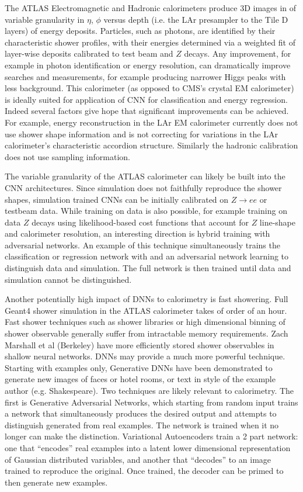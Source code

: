 
The ATLAS Electromagnetic and Hadronic calorimeters produce 3D images
in of variable granularity in $\eta$, $\phi$ versus depth (i.e. the
LAr presampler to the Tile D layers) of energy deposits. Particles,
such as photons, are identified by their characteristic shower
profiles, with their energies determined via a weighted fit of
layer-wise deposits calibrated to test beam and $Z$ decays. Any
improvement, for example in photon identification or energy
resolution, can dramatically improve searches and measurements, for
example producing narrower Higgs peaks with less background. This
calorimeter (as opposed to CMS's crystal EM calorimeter) is ideally
suited for application of CNN for classification and energy
regression. Indeed several factors give hope that significant
improvements can be achieved. For example, energy reconstruction in
the LAr EM calorimeter currently does not use shower shape information
and is not correcting for variations in the LAr calorimeter's
characteristic accordion structure. Similarly the hadronic calibration
does not use sampling information.

The variable granularity of the ATLAS calorimeter can likely be built
into the CNN architectures. Since simulation does not faithfully
reproduce the shower shapes, simulation trained CNNs can be initially
calibrated on $Z\rightarrow e e$ or testbeam data. While training
on data is also possible, for example training on data $Z$ decays
using likelihood-based cost functions that account for $Z$ line-shape
and calorimeter resolution, an interesting direction is hybrid
training with adversarial networks. An example of this technique
simultaneously trains the classification or regression network with
and an adversarial network learning to distinguish data and
simulation. The full network is then trained until data and simulation
cannot be distinguished.

Another potentially high impact of DNNs to calorimetry is fast
showering. Full Geant4 shower simulation in the ATLAS calorimeter
takes of order of an hour. Fast shower techniques such as shower
libraries or high dimensional binning of shower observable generally
suffer from intractable memory requirements. Zach Marshall et al
(Berkeley) have more efficiently stored shower observables in shallow
neural networks. DNNs may provide a much more powerful technique.
Starting with examples only, Generative DNNs have been demonstrated to
generate new images of faces or hotel rooms, or text in style of the
example author (e.g. Shakespeare). Two techniques are likely relevant
to calorimetry. The first is Generative Adversarial Networks, which
starting from random input trains a network that simultaneously produces
the desired output and attempts to distinguish generated from real
examples. The network is trained when it no longer can make the
distinction. Variational Autoencoders train a 2 part network: one that
``encodes'' real examples into a latent lower dimensional
representation of Gaussian distributed variables, and another that
``decodes'' to an image trained to reproduce the original. Once
trained, the decoder can be primed to then generate new examples. 

